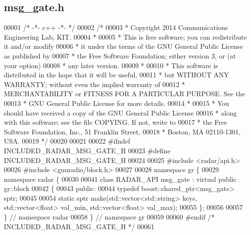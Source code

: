 \subsection{msg\+\_\+gate.\+h}
\label{msg__gate_8h_source}

\begin{DoxyCode}
00001 \textcolor{comment}{/* -*- c++ -*- */}
00002 \textcolor{comment}{/* }
00003 \textcolor{comment}{ * Copyright 2014 Communications Engineering Lab, KIT.}
00004 \textcolor{comment}{ * }
00005 \textcolor{comment}{ * This is free software; you can redistribute it and/or modify}
00006 \textcolor{comment}{ * it under the terms of the GNU General Public License as published by}
00007 \textcolor{comment}{ * the Free Software Foundation; either version 3, or (at your option)}
00008 \textcolor{comment}{ * any later version.}
00009 \textcolor{comment}{ * }
00010 \textcolor{comment}{ * This software is distributed in the hope that it will be useful,}
00011 \textcolor{comment}{ * but WITHOUT ANY WARRANTY; without even the implied warranty of}
00012 \textcolor{comment}{ * MERCHANTABILITY or FITNESS FOR A PARTICULAR PURPOSE.  See the}
00013 \textcolor{comment}{ * GNU General Public License for more details.}
00014 \textcolor{comment}{ * }
00015 \textcolor{comment}{ * You should have received a copy of the GNU General Public License}
00016 \textcolor{comment}{ * along with this software; see the file COPYING.  If not, write to}
00017 \textcolor{comment}{ * the Free Software Foundation, Inc., 51 Franklin Street,}
00018 \textcolor{comment}{ * Boston, MA 02110-1301, USA.}
00019 \textcolor{comment}{ */}
00020 
00021 
00022 \textcolor{preprocessor}{#ifndef INCLUDED\_RADAR\_MSG\_GATE\_H}
00023 \textcolor{preprocessor}{#define INCLUDED\_RADAR\_MSG\_GATE\_H}
00024 
00025 \textcolor{preprocessor}{#include <radar/api.h>}
00026 \textcolor{preprocessor}{#include <gnuradio/block.h>}
00027 
00028 \textcolor{keyword}{namespace }gr \{
00029   \textcolor{keyword}{namespace }radar \{
00030 
00041     \textcolor{keyword}{class }RADAR_API msg_gate : \textcolor{keyword}{virtual} \textcolor{keyword}{public} gr::block
00042     \{
00043      \textcolor{keyword}{public}:
00044       \textcolor{keyword}{typedef} boost::shared\_ptr<msg\_gate> sptr;
00045 
00054       \textcolor{keyword}{static} sptr make(std::vector<std::string> keys, std::vector<float> val\_min, std::vector<float> 
      val\_max);
00055     \};
00056 
00057   \} \textcolor{comment}{// namespace radar}
00058 \} \textcolor{comment}{// namespace gr}
00059 
00060 \textcolor{preprocessor}{#endif }\textcolor{comment}{/* INCLUDED\_RADAR\_MSG\_GATE\_H */}\textcolor{preprocessor}{}
00061 
\end{DoxyCode}
